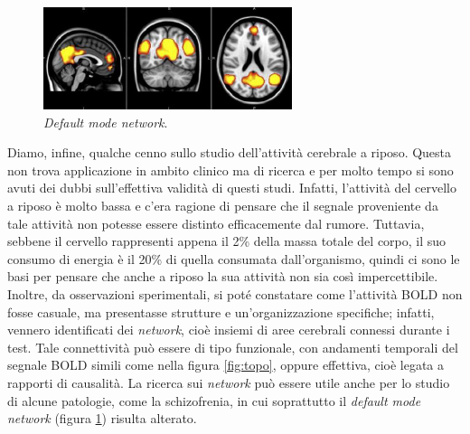 \documentclass{report}
\newcommand{\figref}[1]{figura \ref{#1}}
\numberwithin{equation}{section}
\numberwithin{figure}{section}
\begin{document}
\begin{figure}[htp]
\centering
\includegraphics[scale=1.8]{immagini/default.png}
\caption{\label{fig:default} \textit{Default mode network}.}
\end{figure}

Diamo, infine, qualche cenno sullo studio dell'attività cerebrale a riposo. Questa non trova applicazione in ambito clinico ma di ricerca e per molto tempo si sono avuti dei dubbi sull'effettiva validità di questi studi. Infatti, l'attività del cervello a riposo è molto bassa e c'era ragione di pensare che il segnale proveniente da tale attività non potesse essere distinto efficacemente dal rumore. Tuttavia, sebbene il cervello rappresenti appena il 2\% della massa totale del corpo, il suo consumo di energia è il 20\% di quella consumata dall'organismo, quindi ci sono le basi per pensare che anche a riposo la sua attività non sia così impercettibile. Inoltre, da osservazioni sperimentali, si poté constatare come l'attività BOLD non fosse casuale, ma presentasse strutture e un'organizzazione specifiche; infatti, vennero identificati dei \textit{network}, cioè insiemi di aree cerebrali connessi durante i test. Tale connettività può essere di tipo funzionale, con andamenti temporali del segnale BOLD simili come nella \figref{fig:topo}, oppure effettiva, cioè legata a rapporti di causalità. La ricerca sui \textit{network} può essere utile anche per lo studio di alcune patologie, come la schizofrenia, in cui soprattutto il \textit{default mode network} (\figref{fig:default}) risulta alterato.
\end{document}
